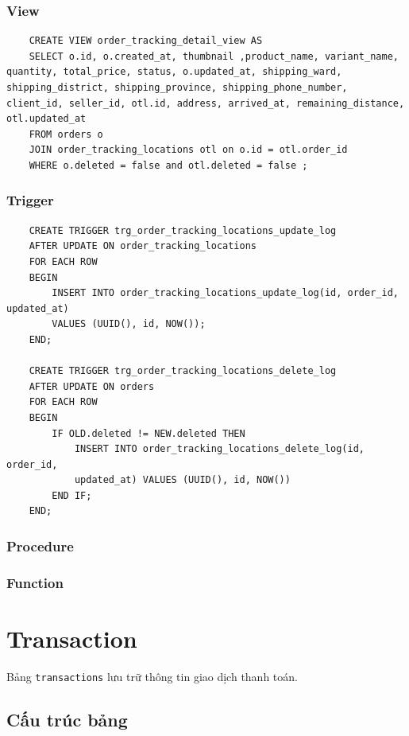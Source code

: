 \subsubsection{View}

\begin{verbatim}
	CREATE VIEW order_tracking_detail_view AS
	SELECT o.id, o.created_at, thumbnail ,product_name, variant_name, quantity, total_price, status, o.updated_at, shipping_ward, shipping_district, shipping_province, shipping_phone_number, client_id, seller_id, otl.id, address, arrived_at, remaining_distance, otl.updated_at
	FROM orders o 
    JOIN order_tracking_locations otl on o.id = otl.order_id
    WHERE o.deleted = false and otl.deleted = false ;
\end{verbatim}

\subsubsection{Trigger}

\begin{verbatim}
    CREATE TRIGGER trg_order_tracking_locations_update_log 
    AFTER UPDATE ON order_tracking_locations 
    FOR EACH ROW 
    BEGIN 
        INSERT INTO order_tracking_locations_update_log(id, order_id, updated_at) 
        VALUES (UUID(), id, NOW());
    END;

    CREATE TRIGGER trg_order_tracking_locations_delete_log
    AFTER UPDATE ON orders
    FOR EACH ROW
    BEGIN 
        IF OLD.deleted != NEW.deleted THEN 
            INSERT INTO order_tracking_locations_delete_log(id, order_id,
            updated_at) VALUES (UUID(), id, NOW())
        END IF;
    END;
\end{verbatim}

\subsubsection{Procedure}

\subsubsection{Function}

\section{Transaction}

Bảng \texttt{transactions} lưu trữ thông tin giao dịch thanh toán.

\subsection{Cấu trúc bảng}


